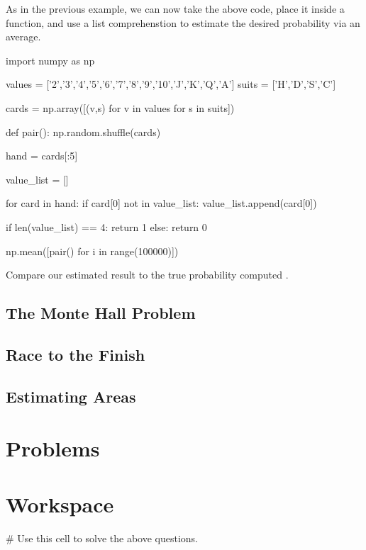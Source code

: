 \documentclass{ximera}
\begin{document}
As in the previous example, we can now take the above code, place it inside a function, and use a list comprehenstion to estimate the desired probability via an average.

\begin{sageCell}
import numpy as np

values = ['2','3','4','5','6','7','8','9','10','J','K','Q','A']
suits = ['H','D','S','C']

cards = np.array([(v,s) for v in values for s in suits])

def pair():
        np.random.shuffle(cards)

        hand = cards[:5]

        value_list = []

        for card in hand:
                if card[0] not in value_list:
                        value_list.append(card[0])

        if len(value_list) == 4:
                return 1
        else:
                return 0

np.mean([pair() for i in range(100000)])
\end{sageCell}

Compare our estimated result to the true probability computed .

\subsection{The Monte Hall Problem}


\subsection{Race to the Finish}



\subsection{Estimating Areas}



\section{Problems}

\begin{question}
\end{question}

\begin{question}
\end{question}

\begin{question}
\end{question}

\section{Workspace}

\begin{sageCell}
# Use this cell to solve the above questions.
\end{sageCell}
\end{document}
